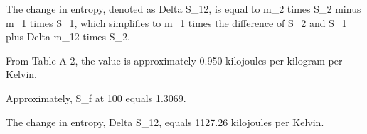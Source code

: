 The change in entropy, denoted as Delta S_12, is equal to m_2 times S_2 minus m_1 times S_1, which simplifies to m_1 times the difference of S_2 and S_1 plus Delta m_12 times S_2.

From Table A-2, the value is approximately 0.950 kilojoules per kilogram per Kelvin.

Approximately, S_f at 100 equals 1.3069.

The change in entropy, Delta S_12, equals 1127.26 kilojoules per Kelvin.